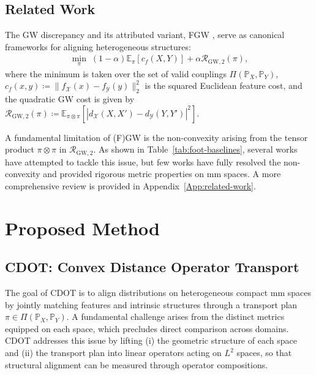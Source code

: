 \documentclass{article}
\theoremstyle{plain}
\theoremstyle{definition}
\theoremstyle{remark}
\begin{document}
\subsection{Related Work}

The GW discrepancy \citep{memoli2011gromov} and its attributed variant, FGW \citep{vayer2020fused}, serve as canonical frameworks for aligning heterogeneous structures:
\begin{align*}
	\min_{\pi} \; (1 - \alpha) \mathbb{E}_{\pi} [ c_f(X,Y) ] + \alpha \mathcal{R}_{\mathrm{GW},2}(\pi),
\end{align*}
where the minimum is taken over the set of valid couplings $\Pi(\mathbb{P}_X,\mathbb{P}_Y)$, $c_f(x,y) \coloneqq \| f_{\mathcal{X}}(x) - f_{\mathcal{Y}}(y)\|_2^2$ is the squared Euclidean feature cost, and the quadratic GW cost is given by $\mathcal{R}_{\mathrm{GW},2}(\pi) \coloneqq \mathbb{E}_{\pi \otimes \pi}[ | d_{\mathcal{X}}(X,X') - d_{\mathcal{Y}}(Y,Y') |^2 ]$. 

A fundamental limitation of (F)GW is the non-convexity arising from the tensor product $\pi \otimes \pi$ in $\mathcal{R}_{\mathrm{GW},2}$. As shown in Table~\ref{tab:foot-baselines}, several works have attempted to tackle this issue, but few works have fully resolved the non-convexity and provided rigorous metric properties on mm spaces. A more comprehensive review is provided in Appendix~\ref{App:related-work}.

\section{Proposed Method}\label{sec:CDOT}

\subsection{CDOT: Convex Distance Operator Transport}

The goal of CDOT is to align distributions on heterogeneous compact mm spaces by jointly matching features and intrinsic structures through a transport plan $\pi \in \Pi(\mathbb{P}_X,\mathbb{P}_Y)$. A fundamental challenge arises from the distinct metrics equipped on each space, which precludes direct comparison across domains. CDOT addresses this issue by lifting (i) the geometric structure of each space and (ii) the transport plan into linear operators acting on $L^2$ spaces, so that structural alignment can be measured through operator compositions.
\end{document}
